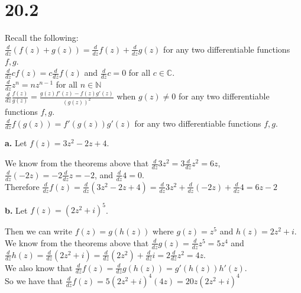 \documentclass{article}
\begin{document}
\section*{20.2}
\begin{center}
    \doublespacing
    Recall the following:
    \\$\frac{d}{dz} (f(z) + g(z)) =\frac{d}{dz} f(z) +\frac{d}{dz} g(z)$ for any two differentiable functions $f, g$.
    \\$\frac{d}{dz} c f(z) = c\frac{d}{dz} f(z)$ and $\frac{d}{dz} c = 0$ for all $c\in\mathbb{C}$.
    \\$\frac{d}{dz} z^n = n z^{n-1}$ for all $n\in\mathbb{N}$
    \\$\frac{d}{dz}\frac{f(z)}{g(z)} =\frac{g(z) f'(z) - f(z) g'(z)}{(g(z))^2}$ when $g(z)\neq 0$ for any two differentiable functions $f, g$.
    \\$\frac{d}{dz} f(g(z)) = f'(g(z)) g'(z)$ for any two differentiable functions $f, g$.
\end{center}

{\Large\textbf{a.}} Let $f(z) = 3z^2 - 2z + 4$.
\begin{center}
    \doublespacing
    We know from the theorems above that $\frac{d}{dz} 3z^2 = 3\frac{d}{dz} z^2 = 6z$, $\frac{d}{dz} (-2z) = -2\frac{d}{dz} z = -2$, and $\frac{d}{dz} 4 = 0$.
    \\Therefore $\frac{d}{dz} f(z) =\frac{d}{dz} (3z^2 - 2z + 4) =\frac{d}{dz} 3z^2 +\frac{d}{dz} (-2z) +\frac{d}{dz} 4 = 6z - 2$ \qedsymbol
\end{center}

{\Large\textbf{b.}} Let $f(z) = (2z^2 + i)^5$.
\begin{center}
    \doublespacing
    Then we can write $f(z) = g(h(z))$ where $g(z) = z^5$ and $h(z) = 2z^2 + i$.
    \\We know from the theorems above that $\frac{d}{dz} g(z) =\frac{d}{dz} z^5 = 5z^4$ and $\frac{d}{dz} h(z) =\frac{d}{dz} (2z^2 + i) =\frac{d}{dz} (2z^2) +\frac{d}{dz} i = 2\frac{d}{dz} z^2 = 4z$.
    \\We also know that $\frac{d}{dz} f(z) =\frac{d}{dz} g(h(z)) = g'(h(z)) h'(z)$.
    \\So we have that $\frac{d}{dz} f(z) = 5(2z^2 + i)^4 (4z) = 20z(2z^2 + i)^4$ \qedsymbol
\end{center}
\end{document}
